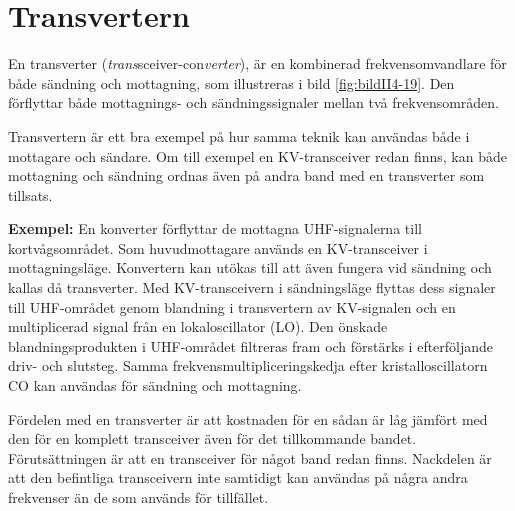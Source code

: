 \section{Transvertern}


En transverter (\emph{trans}sceiver-con\emph{verter}), är en kombinerad
frekvensomvandlare för både sändning och mottagning, som illustreras i
bild \ref{fig:bildII4-19}.
Den förflyttar både mottagnings- och sändningssignaler mellan två
frekvensområden.

Transvertern är ett bra exempel på hur samma teknik kan användas både
i mottagare och sändare.
Om till exempel en KV-transceiver redan finns, kan både mottagning och sändning
ordnas även på andra band med en transverter som tillsats.

\textbf{Exempel:}
En konverter förflyttar de mottagna UHF-signalerna till kortvågsområdet.
Som huvudmottagare används en KV-transceiver i mottagningsläge.
Konvertern kan utökas till att även fungera vid sändning och kallas då
transverter.
Med KV-transceivern i sändningsläge flyttas dess signaler till UHF-området
genom blandning i transvertern av KV-signalen och en multiplicerad signal
från en lokaloscillator (LO).
Den önskade blandningsprodukten i UHF-området filtreras fram och förstärks i
efterföljande driv- och slutsteg.
Samma frekvensmultipliceringskedja efter kristalloscillatorn CO kan användas
för sändning och mottagning.

Fördelen med en transverter är att kostnaden för en sådan är låg jämfört med
den för en komplett transceiver även för det tillkommande bandet.
Förutsättningen är att en transceiver för något band redan finns.
Nackdelen är att den befintliga transceivern inte samtidigt kan användas på
några andra frekvenser än de som används för tillfället.
